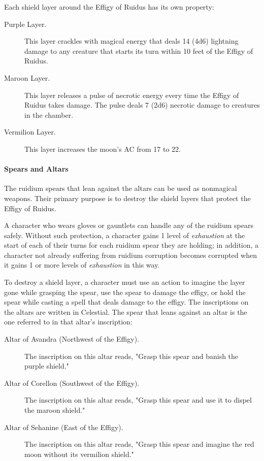 \documentclass[a4paper, 11pt, bg=full, twocolumn, nooutline]{dndbook}
\begin{document}
Each shield layer around the Effigy of Ruidus has its own property:

\begin{description}
\item[Purple Layer.] This layer crackles with magical energy that deals 14 (4d6) lightning damage to any creature that starts its turn within 10 feet of the Effigy of Ruidus.
\item[Maroon Layer.] This layer releases a pulse of necrotic energy every time the Effigy of Ruidus takes damage. The pulse deals 7 (2d6) necrotic damage to creatures in the chamber.
\item[Vermilion Layer.] This layer increases the moon's AC from 17 to 22.
\end{description}

\paragraph{Spears and Altars}

The ruidium spears that lean against the altars can be used as nonmagical weapons. Their primary purpose is to destroy the shield layers that protect the Effigy of Ruidus.

A character who wears gloves or gauntlets can handle any of the ruidium spears safely. Without such protection, a character gains 1 level of \textit{exhaustion} at the start of each of their turns for each ruidium spear they are holding; in addition, a character not already suffering from ruidium corruption becomes corrupted when it gains 1 or more levels of \textit{exhaustion} in this way.

To destroy a shield layer, a character must use an action to imagine the layer gone while grasping the spear, use the spear to damage the effigy, or hold the spear while casting a spell that deals damage to the effigy. The inscriptions on the altars are written in Celestial. The spear that leans against an altar is the one referred to in that altar's inscription:

\begin{description}
\item[Altar of Avandra (Northwest of the Effigy).] The inscription on this altar reads, "Grasp this spear and banish the purple shield."
\item[Altar of Corellon (Southwest of the Effigy).] The inscription on this altar reads, "Grasp this spear and use it to dispel the maroon shield."
\item[Altar of Sehanine (East of the Effigy).] The inscription on this altar reads, "Grasp this spear and imagine the red moon without its vermilion shield."
\end{description}
\end{document}

